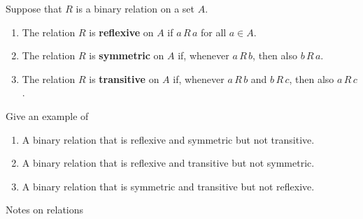 \documentclass[10pt]{beamer}
\begin{document}
\begin{frame}
 

 \begin{mygreenbox}[title=Definition]
Suppose that $R$ is a binary relation on a set $A$.
\begin{enumerate}
	\item The relation $R$ is \textbf{reflexive} on $A$ if $a\,R\,a$ for all $a \in A$.
	\item  The relation $R$ is \textbf{symmetric} on $A$ if, whenever $a\,R\,b$, then also $b\,R\,a$.
	\item The relation $R$ is \textbf{transitive} on $A$ if, whenever $a\,R\,b$ and $b\,R\,c$, then also $a\,R\,c$.
\end{enumerate}
\end{mygreenbox}


 \vfill

 \begin{myredbox}[title=Reading Quiz (Relations)]
Give an example of 
\begin{enumerate}
	\item A binary relation that is reflexive and symmetric but not transitive.
	\item A binary relation that is reflexive and transitive but not symmetric.
	\item A binary relation that is symmetric and transitive but not reflexive.
\end{enumerate}
\end{myredbox}



\end{frame}


\begin{frame}[standout]
Notes on relations
\end{frame}
\end{document}
